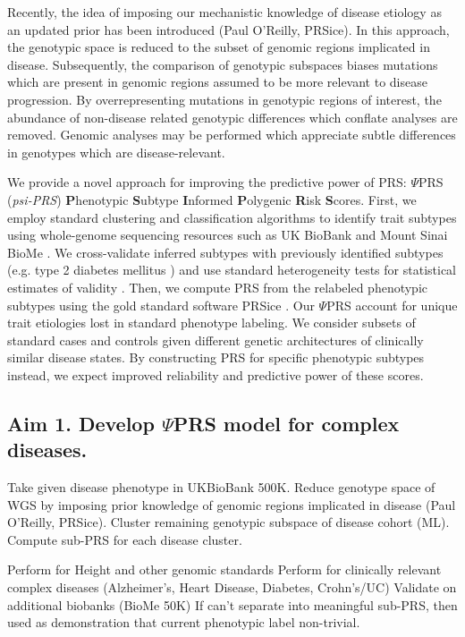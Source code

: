 \documentclass[11pt]{article}  %
\newcommand{\inden}[1]{\mbox{} \hspace{#1} } %
\begin{document}
Recently, the idea of imposing our mechanistic knowledge of disease etiology as an updated prior has been introduced (Paul O’Reilly, PRSice). In this approach, the genotypic space is reduced to the subset of genomic regions implicated in disease. Subsequently, the comparison of genotypic subspaces biases mutations which are present in genomic regions assumed to be more relevant to disease progression. By overrepresenting mutations in genotypic regions of interest, the abundance of non-disease related genotypic differences which conflate analyses are removed. Genomic analyses may be performed which appreciate subtle differences in genotypes which are disease-relevant.

We provide a novel approach for improving the predictive power of PRS: $\Psi$PRS (\textit{psi-PRS}) \textbf{P}henotypic \textbf{S}ubtype \textbf{I}nformed \textbf{P}olygenic \textbf{R}isk \textbf{S}cores. First, we employ standard clustering and classification algorithms to identify trait subtypes using whole-genome sequencing resources such as UK BioBank and Mount Sinai BioMe \cite{bycroft_uk_2018}. We cross-validate inferred subtypes with previously identified subtypes (e.g. type 2 diabetes mellitus \cite{li_identification_2015}) and use standard heterogeneity tests for statistical estimates of validity \cite{dahl_robust_2020}. Then, we compute PRS from the relabeled phenotypic subtypes using the gold standard software PRSice \cite{choi_prsice-2_2019}. Our $\Psi$PRS account for unique trait etiologies lost in standard phenotype labeling. We consider subsets of standard cases and controls given different genetic architectures of clinically similar disease states. By constructing PRS for specific phenotypic subtypes instead, we expect improved reliability and predictive power of these scores.

\subsection*{Aim 1. Develop $\Psi$PRS model for complex diseases.}

Take given disease phenotype in UKBioBank 500K. Reduce genotype space of WGS by imposing prior knowledge of genomic regions implicated in disease (Paul O’Reilly, PRSice). Cluster remaining genotypic subspace of disease cohort (ML). Compute sub-PRS for each disease cluster.

Perform for Height and other genomic standards
Perform for clinically relevant complex diseases (Alzheimer’s, Heart Disease, Diabetes, Crohn’s/UC)
Validate on additional biobanks (BioMe 50K)
If can’t separate into meaningful sub-PRS, then used as demonstration that current phenotypic label non-trivial.
\end{document}
